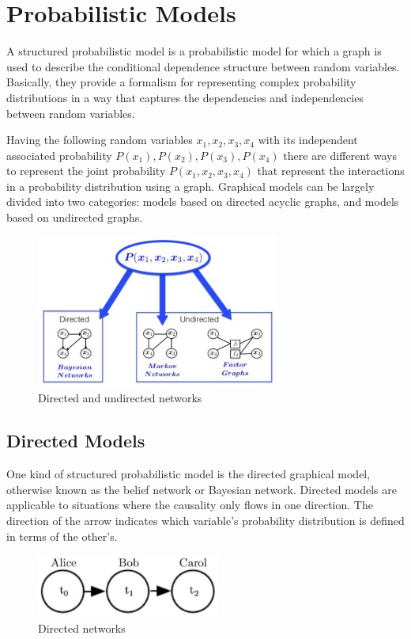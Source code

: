 \chapter{Probabilistic Models}

A structured probabilistic model is a probabilistic model for which a graph is used to describe the conditional dependence structure between random variables. Basically, they provide a formalism for representing complex probability distributions in a way that captures the dependencies and independencies between random variables. 

Having the following random variables $ x_1, x_2, x_3, x_4 $ with its independent associated probability $ P ( x_1), P(x_2), P(x_3), P(x_4) $ there are different ways to represent the joint probability $ P \left( x_1, x_2, x_3, x_4  \right)  $ that represent the interactions in a probability distribution using a graph. Graphical models can be largely divided into two categories: models based on directed acyclic graphs, and models based on undirected graphs. 


\begin{figure}[h]
    \centering
    \includegraphics[width=8cm]{Images/structured-probabilistic.jpg}
    \caption{Directed and undirected networks}
\end{figure}

\section{Directed Models}

One kind of structured probabilistic model is the directed graphical model, otherwise known as the belief network or Bayesian network. Directed models are applicable to situations where the causality only flows in one direction. The direction of the arrow indicates which variable’s probability distribution is defined in terms of the other’s.

\begin{figure}[h]
    \centering
    \includegraphics[width=6cm]{Images/directed-network.jpg}
    \caption{Directed networks}
    \label{fig:directed-networks}
\end{figure}

